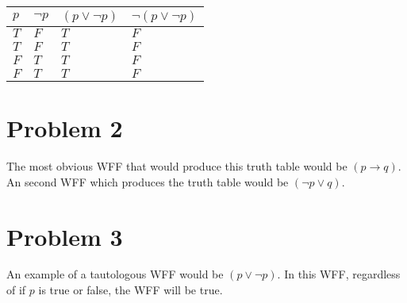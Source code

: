 \documentclass{article}%
\begin{document}
\noindent
\begin{tabular}{l | l | l | l |}
    $p$ & $\neg p$  & $(p \vee \neg p)$ & $\neg (p \vee \neg p)$ \\ \hline
    $T$ & $F$       & $T$               & $F$ \\ \hline
    $T$ & $F$       & $T$               & $F$ \\ \hline
    $F$ & $T$       & $T$               & $F$ \\ \hline
    $F$ & $T$       & $T$               & $F$ \\ \hline
\end{tabular}

\section*{Problem 2}

The most obvious WFF that would produce this truth table would be $(p \rightarrow q)$. An
second WFF which produces the truth table would be $(\neg p \vee q)$.

\section*{Problem 3}

An example of a tautologous WFF would be $(p \vee \neg p)$. In this WFF, regardless of if
$p$ is true or false, the WFF will be true.
\end{document}
